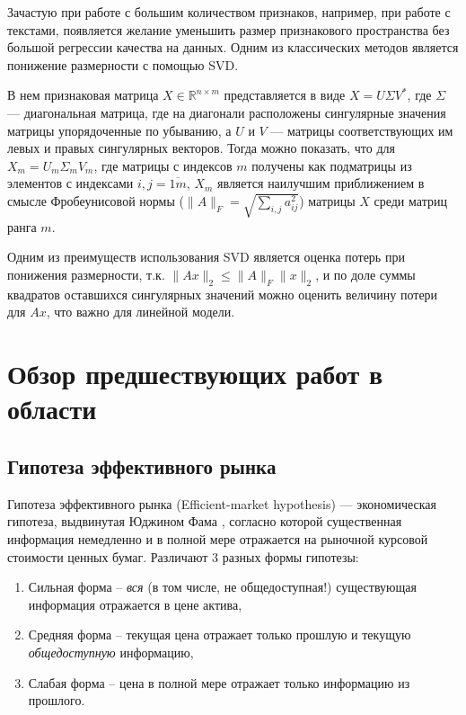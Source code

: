 \documentclass[pdftex,ptm,14pt,a4paper]{extreport}
\begin{document}
Зачастую при работе с большим количеством признаков, например, при работе с текстами, появляется желание уменьшить
размер признакового пространства без большой регрессии качества на данных. Одним из классических методов является
понижение размерности с помощью SVD\cite{svd}.

В нем признаковая матрица $X\in\mathbb{R}^{n\times m}$ представляется в виде $X=U\Sigma V^*$, где $\Sigma$ --- диагональная
матрица, где на диагонали расположены сингулярные значения матрицы упорядоченные по убыванию, а $U$ и $V$ --- матрицы 
соответствующих им левых и правых сингулярных векторов. Тогда можно показать, что для $X_m=U_m\Sigma_m V_m$,
где матрицы с индексов $m$ получены как подматрицы из элементов с индексами $i,j=\overline{1m}$,
$X_m$ является наилучшим приближением в смысле Фробеунисовой нормы ($\|A\|_F = \sqrt{\sum_{i,j} a^2_{ij}}$)
матрицы $X$ среди матриц ранга $m$.

Одним из преимуществ использования SVD является оценка потерь при понижения размерности, т.к. $\|Ax\|_2 \leq \|A\|_F\|x\|_2$,
и по доле суммы квадратов оставшихся сингулярных значений можно оценить величину потери для $Ax$, что важно для линейной
модели.

\iffalse

\chapter{Обзор предшествующих работ в области}

\section{Гипотеза эффективного рынка}

Гипотеза эффективного рынка (Efficient-market hypothesis) --- экономическая гипотеза, выдвинутая Юджином Фама \cite{EFH}, согласно которой существенная информация немедленно и в полной мере отражается на рыночной курсовой стоимости ценных бумаг. Различают 3 разных формы гипотезы:

\begin{enumerate}
\item Сильная форма -- \textit{вся} (в том числе, не общедоступная!) существующая информация отражается в цене актива,
\item Средняя форма -- текущая цена отражает только прошлую и текущую \textit{общедоступную} информацию,
\item Слабая форма -- цена в полной мере отражает только информацию из прошлого.
\end{enumerate}
\end{document}
